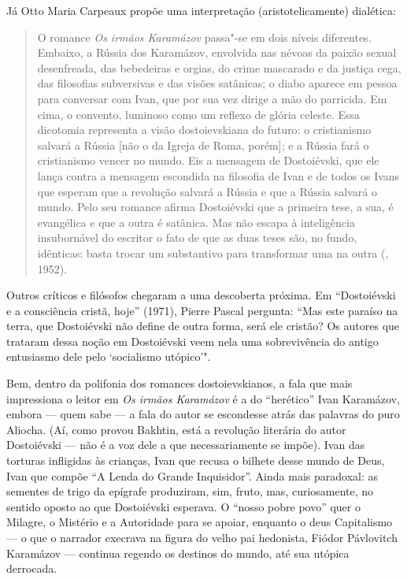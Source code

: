 Já Otto Maria Carpeaux propõe uma interpretação (aristotelicamente) dialética:

\begin{quotation}
O romance \emph{Os irmãos Karamázov} passa"-se em dois níveis diferentes. Embaixo, a Rússia dos Karamázov, envolvida nas névoas da paixão sexual desenfreada, das bebedeiras e orgias, do crime mascarado e da justiça cega, das filosofias subversivas e das visões satânicas; o diabo aparece em pessoa para conversar com Ivan, que por sua vez dirige a mão do parricida. Em cima, o convento, luminoso como um reflexo de glória celeste. Essa dicotomia representa a visão dostoievskiana do futuro: o cristianismo salvará a Rússia [não o da Igreja de Roma, porém]; e a Rússia fará o cristianismo vencer no mundo. Eis a mensagem de Dostoiévski, que ele lança contra a mensagem escondida na filosofia de Ivan e de todos os Ivans que esperam que a revolução salvará a Rússia e que a Rússia salvará o mundo. Pelo seu romance afirma Dostoiévski que a primeira tese, a sua, é evangélica e que a outra é satânica. Mas não escapa à inteligência insubornável do escritor o fato de que as duas teses são, no fundo, idênticas: basta trocar um substantivo para transformar uma na outra (, 1952). 
\end{quotation}

Outros críticos e filósofos chegaram a uma descoberta próxima. Em
``Dostoiévski e a consciência cristã, hoje'' (1971), Pierre Pascal
pergunta: ``Mas este paraíso na terra, que Dostoiévski não define
de outra forma, será ele cristão? Os autores que trataram dessa noção em
Dostoiévski veem nela uma sobrevivência do antigo entusiasmo dele pelo
`socialismo utópico'".

Bem, dentro da polifonia dos romances dostoievskianos, a fala que mais impressiona o leitor em \emph{Os irmãos Karamázov} é a do ``herético'' Ivan Karamázov, embora --- quem sabe --- a fala do autor se escondesse atrás das palavras do puro Aliocha. (Aí, como provou Bakhtin, está a revolução literária do autor Dostoiévski --- não é a voz dele a que necessariamente se impõe). Ivan das torturas infligidas às crianças, Ivan que recusa o bilhete desse mundo de Deus, Ivan que compõe ``A Lenda do Grande Inquisidor''. Ainda mais paradoxal: as sementes de trigo da epígrafe produziram, sim, fruto, mas, curiosamente, no sentido oposto ao
que Dostoiévski esperava. O ``nosso pobre povo'' quer o Milagre, o
Mistério e a Autoridade para se apoiar, enquanto o deus
Capitalismo --- o que o narrador execrava na figura do velho
pai hedonista, Fiódor Pávlovitch Karamázov --- continua regendo
os destinos do mundo, até sua utópica derrocada.

